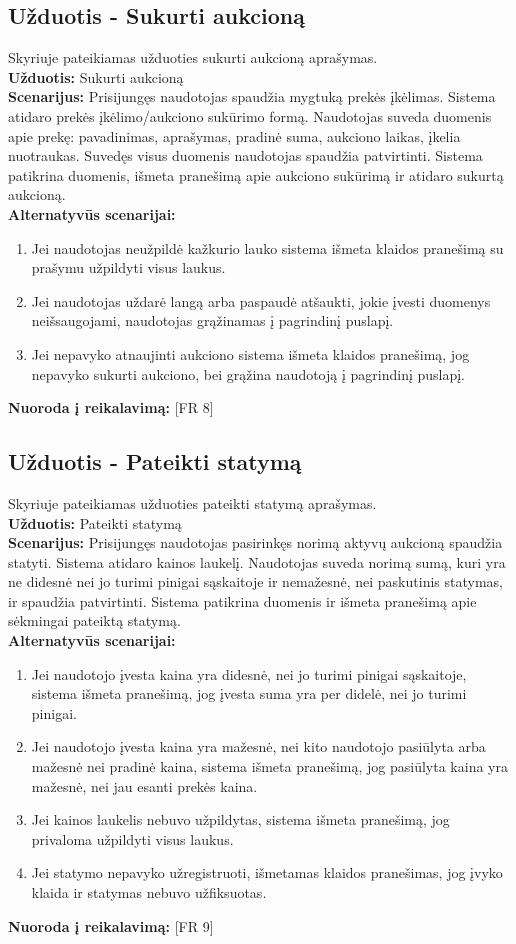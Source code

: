 \documentclass{VUMIFPSkursinis}
\begin{document}
	\subsection{Užduotis - Sukurti aukcioną}
	Skyriuje pateikiamas užduoties sukurti aukcioną aprašymas.\\
	\textbf{Užduotis:}  Sukurti aukcioną \\
	\textbf{Scenarijus:}  Prisijungęs naudotojas spaudžia mygtuką prekės įkėlimas. Sistema atidaro prekės įkėlimo/aukciono sukūrimo formą. Naudotojas suveda duomenis apie prekę: pavadinimas, aprašymas, pradinė suma, aukciono laikas, įkelia nuotraukas. Suvedęs visus duomenis naudotojas spaudžia patvirtinti. Sistema patikrina duomenis, išmeta pranešimą apie aukciono sukūrimą ir atidaro sukurtą aukcioną.\\
	\textbf{Alternatyvūs scenarijai:}
	\begin{enumerate}
		\item Jei naudotojas neužpildė kažkurio lauko sistema išmeta klaidos pranešimą su prašymu užpildyti visus laukus. 
		\item Jei naudotojas uždarė langą arba paspaudė atšaukti, jokie įvesti duomenys neišsaugojami, naudotojas grąžinamas į pagrindinį puslapį. 
		\item Jei nepavyko atnaujinti aukciono sistema išmeta klaidos pranešimą, jog nepavyko sukurti aukciono, bei grąžina naudotoją į pagrindinį puslapį. 
	\end{enumerate}
	\textbf{Nuoroda į reikalavimą: } [FR 8]
	
	\subsection{Užduotis - Pateikti statymą}
	Skyriuje pateikiamas užduoties pateikti statymą aprašymas.\\
	\textbf{Užduotis:}  Pateikti statymą \\
	\textbf{Scenarijus:}  Prisijungęs naudotojas pasirinkęs norimą aktyvų aukcioną spaudžia statyti. Sistema atidaro kainos laukelį. Naudotojas suveda norimą sumą, kuri yra ne didesnė nei jo turimi pinigai sąskaitoje ir nemažesnė, nei paskutinis statymas, ir spaudžia patvirtinti. Sistema patikrina duomenis ir išmeta pranešimą apie sėkmingai pateiktą statymą. \\
	\textbf{Alternatyvūs scenarijai:}
	\begin{enumerate}
		\item Jei naudotojo įvesta kaina yra didesnė, nei jo turimi pinigai sąskaitoje, sistema išmeta pranešimą, jog įvesta suma yra per didelė, nei jo turimi pinigai. 
		\item Jei naudotojo įvesta kaina yra mažesnė, nei kito naudotojo pasiūlyta arba mažesnė nei pradinė kaina, sistema išmeta pranešimą, jog pasiūlyta kaina yra mažesnė, nei jau esanti prekės kaina. 
		\item Jei kainos laukelis nebuvo užpildytas, sistema išmeta pranešimą, jog privaloma užpildyti visus laukus. 
		\item Jei statymo nepavyko užregistruoti, išmetamas klaidos pranešimas, jog įvyko klaida ir statymas nebuvo užfiksuotas. 
	\end{enumerate}
	\textbf{Nuoroda į reikalavimą: } [FR 9]
	
\end{document}
